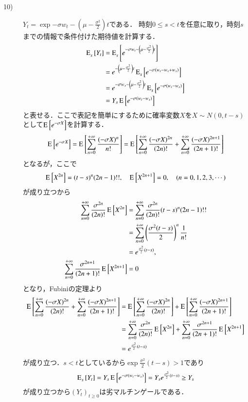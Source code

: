 \begin{prf}
\begin{description}
	\item[10)] 
		$Y_t = \exp{-\sigma w_t - \left(\mu - \frac{\sigma^2}{2}\right)t}$である．
		時刻$0 \leq s < t$を任意に取り，時刻$s$までの情報で条件付けた期待値を計算する．
		\begin{align}
			\Exp{Y_t}{s}{} &= \Exp{\exp{-\sigma w_t - \left(\mu - \frac{\sigma^2}{2}\right)t}}{s}{} \\
			&= \exp{- \left(\mu - \frac{\sigma^2}{2}\right)t} \Exp{\exp{-\sigma (w_t - w_s + w_s)}}{s}{} \\
			&= \exp{-\sigma w_s - \left(\mu - \frac{\sigma^2}{2}\right)t} \Exp{\exp{-\sigma (w_t - w_s)}}{s}{} \\
			&= Y_s \Exp{\exp{-\sigma (w_t - w_s)}}{}{}
		\end{align}
		と表せる．ここで表記を簡単にするために確率変数$X$を$X \sim N(0, t-s)$として$\Exp{\exp{-\sigma X}}{}{}$を計算する．
		\begin{align}
			\Exp{\exp{-\sigma X}}{}{} = \Exp{\sum_{n=0}^{+\infty} \frac{(-\sigma X)^n}{n!}}{}{} 
			= \Exp{\sum_{n=0}^{+\infty} \frac{(-\sigma X)^{2n}}{(2n)!} + \sum_{n=0}^{+\infty} \frac{(-\sigma X)^{2n+1}}{(2n+1)!}}{}{} 
		\end{align}
		となるが，ここで
		\begin{align}
			\Exp{X^{2n}}{}{} = (t-s)^n (2n-1)!!, \quad \Exp{X^{2n + 1}}{}{} = 0, \quad (n = 0,1,2,3,\cdots)
		\end{align}
		が成り立つから
		\begin{align}
			\sum_{n=0}^{+\infty} \frac{\sigma^{2n}}{(2n)!} \Exp{X^{2n}}{}{} 
			&= \sum_{n=0}^{+\infty} \frac{\sigma^{2n}}{(2n)!} (t-s)^n (2n-1)!! \\
			&= \sum_{n=0}^{+\infty} \left(\frac{\sigma^2(t-s)}{2}\right)^n \frac{1}{n!} \\
			&= \exp{\frac{\sigma^2}{2}(t-s)}, \\
			\sum_{n=0}^{+\infty} \frac{\sigma^{2n+1}}{(2n+1)!} \Exp{X^{2n+1}}{}{} &= 0
		\end{align}
		となり，Fubiniの定理より
		\begin{align}
			\Exp{\sum_{n=0}^{+\infty} \frac{(-\sigma X)^{2n}}{(2n)!} + \sum_{n=0}^{+\infty} \frac{(-\sigma X)^{2n+1}}{(2n+1)!}}{}{}
			&= \Exp{\sum_{n=0}^{+\infty} \frac{(-\sigma X)^{2n}}{(2n)!}}{}{}
			+ \Exp{\sum_{n=0}^{+\infty} \frac{(-\sigma X)^{2n+1}}{(2n+1)!}}{}{} \\
			&= \sum_{n=0}^{+\infty} \frac{\sigma^{2n}}{(2n)!} \Exp{X^{2n}}{}{}
			+ \sum_{n=0}^{+\infty} \frac{\sigma^{2n+1}}{(2n+1)!} \Exp{X^{2n+1}}{}{} \\
			&= \exp{\frac{\sigma^2}{2}(t-s)}
		\end{align}
		が成り立つ．$s < t$としているから$\exp{\frac{\sigma^2}{2}(t-s)} > 1$であり
		\begin{align}
			\Exp{Y_t}{s}{} = Y_s \Exp{\exp{-\sigma (w_t - w_s)}}{}{} = Y_s\exp{\frac{\sigma^2}{2}(t-s)} \geq Y_s
		\end{align}
		が成り立つから$(Y_t)_{t \geq 0}$は劣マルチンゲールである．
		\QED
\end{description}
\end{prf}
